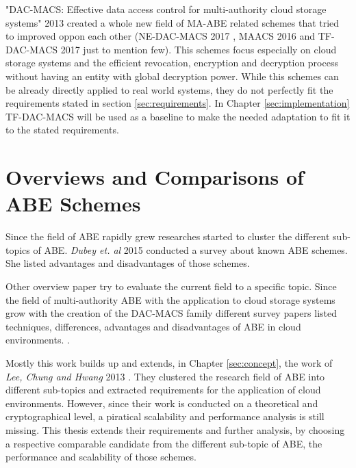 "DAC-MACS: Effective data access control for multi-authority cloud storage systems" 2013 \cite{yang2013dac} created a whole new field of MA-ABE related schemes that tried to improved oppon each other (NE-DAC-MACS 2017 \cite{wu2017security}, MAACS 2016 \cite{li2016secure} and TF-DAC-MACS 2017 \cite{li2017two} just to mention few). This schemes focus especially on cloud storage systems and the efficient revocation, encryption and decryption process without having an entity with global decryption power. While this schemes can be already directly applied to real world systems, they do not perfectly fit the requirements stated in section \ref{sec:requirements}. In Chapter \ref{sec:implementation} TF-DAC-MACS will be used as a baseline to make the needed adaptation to fit it to the stated requirements. 

\section{Overviews and Comparisons of ABE Schemes}
Since the field of ABE rapidly grew researches started to cluster the different sub-topics of ABE. \textit{Dubey et. al} 2015 \cite{dubeysurvey} conducted a survey about known ABE schemes. She listed advantages and disadvantages of those schemes. 

Other overview paper try to evaluate the current field to a specific topic. Since the field of multi-authority ABE with the application to cloud storage systems grow with the creation of the DAC-MACS family different survey papers listed techniques, differences, advantages and disadvantages of ABE in cloud environments. \cite{nagarajan2018overview}. 

Mostly this work builds up and extends, in Chapter \ref{sec:concept}, the work of \textit{Lee, Chung and Hwang} 2013 \cite{lee2013survey}. They clustered the research field of ABE into different sub-topics and extracted requirements for the application of cloud environments. However, since their work is conducted on a theoretical and cryptographical level, a piratical scalability and performance analysis is still missing. This thesis  extends their requirements and further analysis, by choosing a respective comparable candidate from the different sub-topic of ABE, the performance and scalability of those schemes. 

